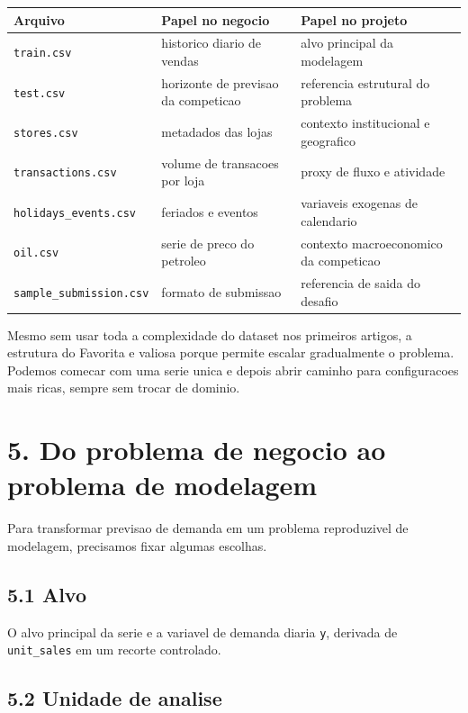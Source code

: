 \documentclass[12pt]{article}
\begin{document}
\begin{longtable}[]{@{}lll@{}}
\toprule\noalign{}
Arquivo & Papel no negocio & Papel no projeto \\
\midrule\noalign{}
\endhead
\bottomrule\noalign{}
\endlastfoot
\texttt{train.csv} & historico diario de vendas & alvo principal da modelagem \\
\texttt{test.csv} & horizonte de previsao da competicao & referencia estrutural do problema \\
\texttt{stores.csv} & metadados das lojas & contexto institucional e geografico \\
\texttt{transactions.csv} & volume de transacoes por loja & proxy de fluxo e atividade \\
\texttt{holidays\_events.csv} & feriados e eventos & variaveis exogenas de calendario \\
\texttt{oil.csv} & serie de preco do petroleo & contexto macroeconomico da competicao \\
\texttt{sample\_submission.csv} & formato de submissao & referencia de saida do desafio \\
\end{longtable}

Mesmo sem usar toda a complexidade do dataset nos primeiros artigos, a estrutura do Favorita e valiosa porque permite escalar gradualmente o problema. Podemos comecar com uma serie unica e depois abrir caminho para configuracoes mais ricas, sempre sem trocar de dominio.

\section{5. Do problema de negocio ao problema de modelagem}\label{5-do-problema-de-negocio-ao-problema-de-modelagem}

Para transformar previsao de demanda em um problema reproduzivel de modelagem, precisamos fixar algumas escolhas.

\subsection{5.1 Alvo}\label{51-alvo}

O alvo principal da serie e a variavel de demanda diaria \texttt{y}, derivada de \texttt{unit\_sales} em um recorte controlado.

\subsection{5.2 Unidade de analise}\label{52-unidade-de-analise}
\end{document}
